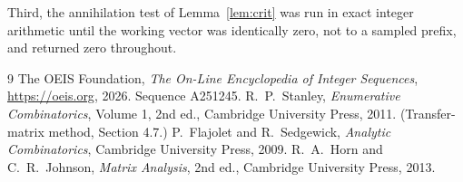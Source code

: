 \documentclass[11pt,a4paper]{article}
\theoremstyle{plain}
\theoremstyle{definition}
\begin{document}
Third, the annihilation test of Lemma~\ref{lem:crit} was run in exact integer arithmetic
until the working vector was identically zero, not to a sampled prefix, and returned zero
throughout.

\begin{thebibliography}{9}
 The OEIS Foundation, \emph{The On-Line Encyclopedia of Integer
Sequences}, \url{https://oeis.org}, 2026. Sequence A251245.
 R.~P.~Stanley, \emph{Enumerative Combinatorics}, Volume 1, 2nd ed.,
Cambridge University Press, 2011. (Transfer-matrix method, Section 4.7.)
 P.~Flajolet and R.~Sedgewick, \emph{Analytic Combinatorics}, Cambridge
University Press, 2009.
 R.~A.~Horn and C.~R.~Johnson, \emph{Matrix Analysis}, 2nd ed., Cambridge
University Press, 2013.
\end{thebibliography}
\end{document}
